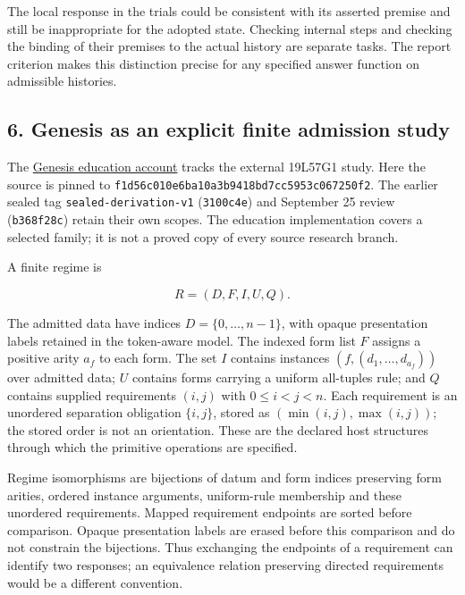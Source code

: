 \documentclass[
  11pt,
]{article}
\begin{document}
The local response in the trials could be consistent with its asserted
premise and still be inappropriate for the adopted state. Checking
internal steps and checking the binding of their premises to the actual
history are separate tasks. The report criterion makes this distinction
precise for any specified answer function on admissible histories.

\subsection{6. Genesis as an explicit finite admission
study}\label{genesis-as-an-explicit-finite-admission-study}

The \href{docs/sources/genesis_education.txt}{Genesis education account}
tracks the external 19L57G1 study. Here the source is pinned to
\nolinkurl{f1d56c010e6ba10a3b9418bd7cc5953c067250f2}. The earlier sealed
tag \nolinkurl{sealed-derivation-v1} (\nolinkurl{3100c4e}) and September 25
review (\nolinkurl{b368f28c}) retain their own scopes. The education
implementation covers a selected family; it is not a proved copy of
every source research branch.

A finite regime is

\[
R=(D,F,I,U,Q).
\]

The admitted data have indices \(D=\{0,\ldots,n-1\}\), with opaque
presentation labels retained in the token-aware model. The indexed form
list \(F\) assigns a positive arity \(a_f\) to each form. The set \(I\)
contains instances \((f,(d_1,\ldots,d_{a_f}))\) over admitted data;
\(U\) contains forms carrying a uniform all-tuples rule; and \(Q\)
contains supplied requirements \((i,j)\) with \(0\le i<j<n\). Each
requirement is an unordered separation obligation \(\{i,j\}\), stored as
\((\min(i,j),\max(i,j))\); the stored order is not an orientation. These
are the declared host structures through which the primitive operations
are specified.

Regime isomorphisms are bijections of datum and form indices preserving
form arities, ordered instance arguments, uniform-rule membership and
these unordered requirements. Mapped requirement endpoints are sorted
before comparison. Opaque presentation labels are erased before this
comparison and do not constrain the bijections. Thus exchanging the
endpoints of a requirement can identify two responses; an equivalence
relation preserving directed requirements would be a different
convention.
\end{document}
